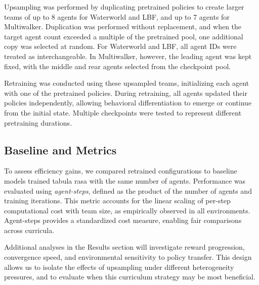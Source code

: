 \documentclass{article}
\begin{document}
Upsampling was performed by duplicating pretrained policies to create larger teams of up to 8 agents for Waterworld and LBF, and up to 7 agents for Multiwalker. Duplication was performed without replacement, and when the target agent count exceeded a multiple of the pretrained pool, one additional copy was selected at random. For Waterworld and LBF, all agent IDs were treated as interchangeable. In Multiwalker, however, the leading agent was kept fixed, with the middle and rear agents selected from the checkpoint pool.

Retraining was conducted using these upsampled teams, initializing each agent with one of the pretrained policies. During retraining, all agents updated their policies independently, allowing behavioral differentiation to emerge or continue from the initial state. Multiple checkpoints were tested to represent different pretraining durations.

\subsection{Baseline and Metrics}

To assess efficiency gains, we compared retrained configurations to baseline models trained tabula rasa with the same number of agents. Performance was evaluated using \textit{agent-steps}, defined as the product of the number of agents and training iterations. This metric accounts for the linear scaling of per-step computational cost with team size, as empirically observed in all environments. Agent-steps provides a standardized cost measure, enabling fair comparisons across curricula.

Additional analyses in the Results section will investigate reward progression, convergence speed, and environmental sensitivity to policy transfer. This design allows us to isolate the effects of upsampling under different heterogeneity pressures, and to evaluate when this curriculum strategy may be most beneficial.


\vspace{3em}

        
\end{document}
